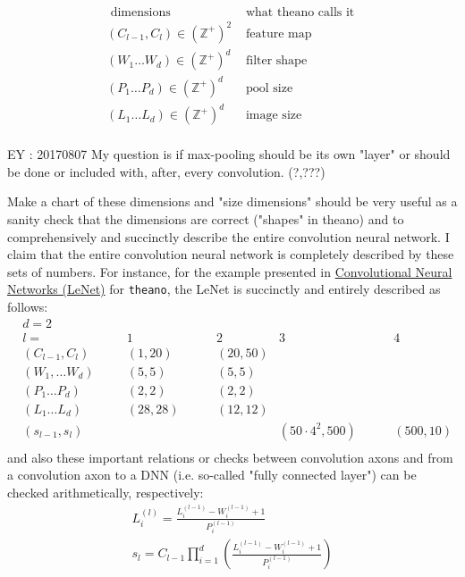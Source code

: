 \documentclass[10pt]{amsart}
\begin{document}
\begin{multicols*}{2}
\begin{equation}
\begin{aligned}
\text{ dimensions } & \text{ what theano calls it } \\ 
(C_{l-1}, C_l) \in (\mathbb{Z}^+)^2 & \text{ feature map } \\ 
(W_1 \dots W_d) \in (\mathbb{Z}^+)^d & \text{ filter shape }  \\
(P_1 \dots P_d) \in (\mathbb{Z}^+)^d & \text{ pool size  }  \\ 
(L_1 \dots L_d) \in (\mathbb{Z}^+)^d & \text{ image size }  \\
\end{aligned}
\end{equation}

EY : 20170807 My question is if max-pooling should be its own "layer" or should be done or included with, after, every convolution.  (?,???)

Make a chart of these dimensions and "size dimensions" should be very useful as a sanity check that the dimensions are correct ("shapes" in theano) and to comprehensively and succinctly describe the entire convolution neural network.  I claim that the entire convolution neural network is completely described by these sets of numbers.  For instance, for the example presented in 
\href{http://deeplearning.net/tutorial/lenet.html}{Convolutional Neural Networks (LeNet)} for \verb|theano|, the LeNet is succinctly and entirely described as follows:  
\[
\begin{aligned}
& d=2 &  &  & & \\
& l = & 1  \qquad \, &  2 & 3 & \qquad \, 4  \\
& (C_{l-1}, C_l ) \qquad \, & (1,20) \qquad \, & (20,50) & & \\
& (W_1, \dots W_d) & (5,5) \qquad \, &  (5,5) & & \\ 
& (P_1 \dots P_d) & (2,2) \qquad \, & (2,2) & & \\
& (L_1\dots L_d) & (28,28) \qquad \, & (12,12) & & \\ 
& (s_{l-1}, s_l) &                 &              & (50\cdot 4^2, 500) & \qquad \, (500,10)  \\
\end{aligned}
\]
and also these important relations or checks between convolution axons and from a convolution axon to a DNN (i.e. so-called "fully connected layer") can be checked arithmetically, respectively:
\begin{equation}
\begin{gathered}
	L_i^{(l)} = \frac{L_i^{(l-1)} - W_i^{(l-1)} + 1}{ P_i^{(l-1)} } \\ 
s_l = C_{l-1} \prod_{i=1}^d \left( \frac{ L_i^{(l-1)} - W_i^{(l-1)} + 1}{ P_i^{(l-1)} } \right) 
\end{gathered}
\end{equation}


\end{multicols*}
\end{document}
